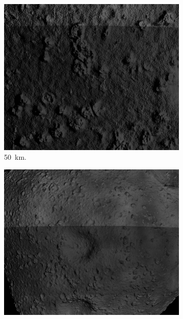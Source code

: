 \begin{figure}[htb]
    \centering
        \begin{subfigure}[b]{0.32\textwidth}
            \centering
            \includegraphics[width=\textwidth]{doc/thesis/0_figures/rendering_artefacts/50_10_SssbOnly_2017-08-15T115845-190000.jpg}
            \caption{\SI{50}{\kilo\meter}.}
            \label{fig:render_artefacts_50}
        \end{subfigure}
        \begin{subfigure}[b]{0.32\textwidth}
            \centering
            \includegraphics[width=\textwidth]{doc/thesis/0_figures/rendering_artefacts/200_10_SssbOnly_2017-08-15T115845-190000.jpg}

\end{subfigure}
\end{figure}
